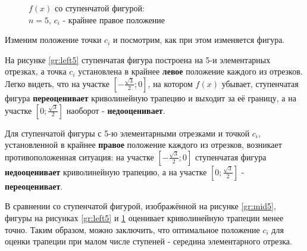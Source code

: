 \documentclass[12pt, a4paper]{article}
\begin{document}
\begin{figure}
\begin{minipage}{.5\textwidth}
\caption{$f(x)$ со ступенчатой фигурой:\\ $n = 5$, $c_i$ - крайнее правое положение}
\label{gr:right5}
\end{minipage}
\end{figure}

Изменим положение точки $c_i$ и посмотрим, как при этом изменяется фигура.

На рисунке \ref{gr:left5} ступенчатая фигура построена на 5-и элементарных отрезках, а точка $c_i$ установлена в крайнее \textbf{левое} положение каждого из отрезков. Легко видеть, что на участке 
$\left[-\frac{\sqrt{3}}{2};0\right]$, на котором $f(x)$ убывает, ступенчатая фигура \textbf{переоценивает} криволинейную трапецию и выходит за её границу, а на участке $\left[0;\frac{\sqrt{3}}{2}\right]$ наоборот - \textbf{недооценивает}.

Для ступенчатой фигуры с 5-ю элементарными отрезками и точкой $c_i$, установленной в крайнее \textbf{правое} положение каждого из отрезков, возникает противоположенная ситуация: на участке 
$\left[-\frac{\sqrt{3}}{2};0\right]$ ступенчатая фигура \textbf{недооценивает} криволинейную трапецию, а на участке $\left[0;\frac{\sqrt{3}}{2}\right]$ - \textbf{переоценивает}.

В сравнении со ступенчатой фигурой, изображённой на рисунке \ref{gr:mid5}, фигуры на рисунках \ref{gr:left5} и \ref{gr:right5} оценивает криволинейную трапеции менее точно. Таким образом, можно заключить, что оптимальное положение $c_i$ для оценки трапеции при малом числе ступеней - середина элементарного отрезка.

\end{document}
